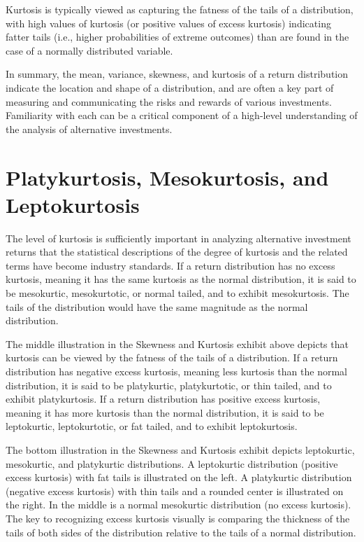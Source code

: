 \documentclass[11pt]{article}
\begin{document}
Kurtosis is typically viewed as capturing the fatness of the tails of a distribution, with high values of kurtosis (or positive values of excess kurtosis) indicating fatter tails (i.e., higher probabilities of extreme outcomes) than are found in the case of a normally distributed variable.

In summary, the mean, variance, skewness, and kurtosis of a return distribution indicate the location and shape of a distribution, and are often a key part of measuring and communicating the risks and rewards of various investments. Familiarity with each can be a critical component of a high-level understanding of the analysis of alternative investments.

\section*{Platykurtosis, Mesokurtosis, and Leptokurtosis}
The level of kurtosis is sufficiently important in analyzing alternative investment returns that the statistical descriptions of the degree of kurtosis and the related terms have become industry standards. If a return distribution has no excess kurtosis, meaning it has the same kurtosis as the normal distribution, it is said to be mesokurtic, mesokurtotic, or normal tailed, and to exhibit mesokurtosis. The tails of the distribution would have the same magnitude as the normal distribution.

The middle illustration in the Skewness and Kurtosis exhibit above depicts that kurtosis can be viewed by the fatness of the tails of a distribution. If a return distribution has negative excess kurtosis, meaning less kurtosis than the normal distribution, it is said to be platykurtic, platykurtotic, or thin tailed, and to exhibit platykurtosis. If a return distribution has positive excess kurtosis, meaning it has more kurtosis than the normal distribution, it is said to be leptokurtic, leptokurtotic, or fat tailed, and to exhibit leptokurtosis.

The bottom illustration in the Skewness and Kurtosis exhibit depicts leptokurtic, mesokurtic, and platykurtic distributions. A leptokurtic distribution (positive excess kurtosis) with fat tails is illustrated on the left. A platykurtic distribution (negative excess kurtosis) with thin tails and a rounded center is illustrated on the right. In the middle is a normal mesokurtic distribution (no excess kurtosis). The key to recognizing excess kurtosis visually is comparing the thickness of the tails of both sides of the distribution relative to the tails of a normal distribution.
\end{document}
